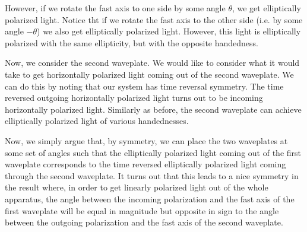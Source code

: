 However, if we rotate the fast axis to one side by some angle $\theta$, we get elliptically polarized light. Notice tht if we rotate the fast axis to the other side (i.e. by some angle $-\theta$) we also get elliptically polarized light. However, this light is elliptically polarized with the same ellipticity, but with the opposite handedness.

Now, we consider the second waveplate. We would like to consider what it would take to get horizontally polarized light coming out of the second waveplate. We can do this by noting that our system has time reversal symmetry. The time reversed outgoing horizontally polarized light turns out to be incoming horizontally polarized light. Similarly as before, the second waveplate can achieve elliptically polarized light of various handednesses.

Now, we simply argue that, by symmetry, we can place the two waveplates at some set of angles such that the elliptically polarized light coming out of the first waveplate corresponds to the time reversed elliptically polarized light coming through the second waveplate. It turns out that this leads to a nice symmetry in the result where, in order to get linearly polarized light out of the whole apparatus, the angle between the incoming polarization and the fast axis of the first waveplate will be equal in magnitude but opposite in sign to the angle between the outgoing polarization and the fast axis of the second waveplate.

